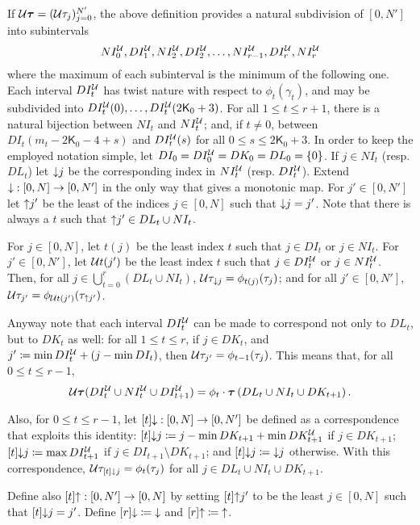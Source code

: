 If ${\mathcal U}\bm\tau=({\mathcal U}\tau_j)_{j=0}^{N'}$, the above definition provides a natural subdivision of $[0,N']$ into subintervals
$$
NI_0^{\mathcal U}, DI_1^{\mathcal U},NI_2^{\mathcal U},DI_2^{\mathcal U},\ldots,NI_{r-1}^{\mathcal U},DI_r^{\mathcal U}, NI_r^{\mathcal U}
$$
where the maximum of each subinterval is the minimum of the following one. Each interval $DI_t^{\mathcal U}$ has twist nature with respect to $\phi_t(\gamma_t)$, and may be subdivided into $DI_t^{\mathcal U}(0),\ldots, DI_t^{\mathcal U}(2\mathsf{K}_0+3)$. For all $1\leq t\leq r+1$, there is a natural bijection between $NI_t$ and $NI_t^{\mathcal U}$; and, if $t\not=0$, between $DI_t(m_t-2\mathsf{K}_0-4+s)$ and $DI_t^{\mathcal U}(s)$ for all $0\leq s \leq 2\mathsf{K}_0+3$. In order to keep the employed notation simple, let $DI_0=DI_0^{\mathcal U}=DK_0=DL_0=\{0\}$. If $j\in NI_t$ (resp. $DL_t$) let $\mathord{\downarrow} j$ be the corresponding index in $NI_t^{\mathcal U}$ (resp. $DI_t^{\mathcal U}$). Extend $\mathord{\downarrow}:[0,N]\rightarrow [0,N']$ in the only way that gives a monotonic map. For $j'\in [0,N']$ let $\mathord{\uparrow} j'$ be the least of the indices $j\in[0,N]$ such that $\mathord{\downarrow} j=j'$. Note that there is always a $t$ such that $\mathord{\uparrow} j'\in DL_t\cup NI_t$.

For $j\in [0,N]$, let $t(j)$ be the least index $t$ such that $j\in DI_t$ or $j\in NI_t$. For $j'\in [0,N']$, let ${\mathcal U} t(j')$ be the least index $t$ such that $j\in DI_t^{\mathcal U}$ or $j\in NI_t^{\mathcal U}$. Then, for all $j\in \bigcup_{t=0}^{r} (DL_t\cup NI_t)$, ${\mathcal U}\tau_{\mathord{\downarrow} j}=\phi_{t(j)}(\tau_j)$; and for all $j'\in[0,N']$, ${\mathcal U}\tau_{j'}=\phi_{{\mathcal U} t(j')}(\tau_{\mathord{\uparrow} j'})$.

Anyway note that each interval $DI^{\mathcal U}_t$ can be made to correspond not only to $DL_t$, but to $DK_t$ as well: for all $1\leq t \leq r$, if $j\in DK_t$, and $j'\coloneqq \min DI_t^{\mathcal U} + (j - \min DI_t)$, then ${\mathcal U}\tau_{j'}=\phi_{t-1}(\tau_j)$. This means that, for all $0\leq t \leq r-1$,
$$
{\mathcal U}\bm\tau(DI_t^{\mathcal U}\cup NI_t^{\mathcal U}\cup DI_{t+1}^{\mathcal U}) = \phi_t\cdot  \bm\tau\left(DL_t\cup NI_t\cup DK_{t+1}\right).
$$

Also, for $0\leq t\leq r-1$, let $[t]\mathord{\downarrow}:[0,N]\rightarrow [0,N']$ be defined as a correspondence that exploits this identity: $[t]\mathord{\downarrow} j\coloneqq j-\min DK_{t+1}+\min DK_{t+1}^{\mathcal U}$ if $j\in DK_{t+1}$; $[t]\mathord{\downarrow} j\coloneqq \max DI_{t+1}^{\mathcal U}$ if $j\in DI_{t+1}\setminus DK_{t+1}$; and $[t]\mathord{\downarrow} j\coloneqq \mathord{\downarrow} j$ otherwise. With this correspondence, ${\mathcal U}\tau_{[t]\mathord{\downarrow} j}=\phi_t(\tau_j)$ for all $j\in DL_t\cup NI_t\cup DK_{t+1}$.

Define also $[t]\mathord{\uparrow}:[0,N']\rightarrow [0,N]$ by setting $[t]\mathord{\uparrow} j'$ to be the least $j\in[0,N]$ such that $[t]\mathord{\downarrow} j=j'$. Define $[r]\mathord{\downarrow}\coloneqq \mathord{\downarrow}$ and $[r]\mathord{\uparrow}\coloneqq\mathord{\uparrow}$.

